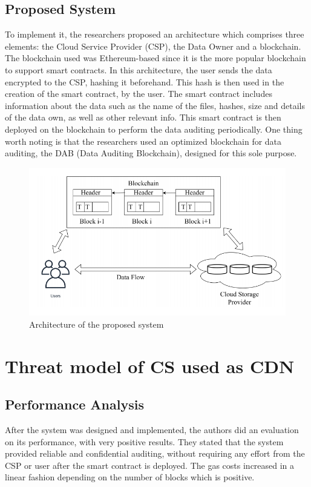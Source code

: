 \documentclass[14pt,oneside]{extreport}
\begin{document}
\subsection{Proposed System}
To implement it, the researchers proposed an architecture which comprises three elements: the Cloud Service Provider (CSP), the Data Owner and a blockchain. The blockchain used was Ethereum-based since it is the more popular blockchain to support smart contracts. In this architecture, the user sends the data encrypted to the CSP, hashing it beforehand. This hash is then used in the creation of the smart contract, by the user. The smart contract includes information about the data such as the name of the files, hashes, size and details of the data own, as well as other relevant info. This smart contract is then deployed on the blockchain to perform the data auditing periodically. One thing worth noting is that the researchers used an optimized blockchain for data auditing, the DAB (Data Auditing Blockchain), designed for this sole purpose.
\begin{figure}[H]
  \centering
  \includegraphics[width=\textwidth]{paper5/arquitetura.png}
  \caption{Architecture of the proposed system}
  \label{fig:image}
\end{figure}
\section{Threat model of CS used as CDN}
\subsection{Performance Analysis}
After the system was designed and implemented, the authors did an evaluation on its performance, with very positive results. They stated that the system provided reliable and confidential auditing, without requiring any effort from the CSP or user after the smart contract is deployed. The gas costs increased in a linear fashion depending on the number of blocks which is positive.
\end{document}
